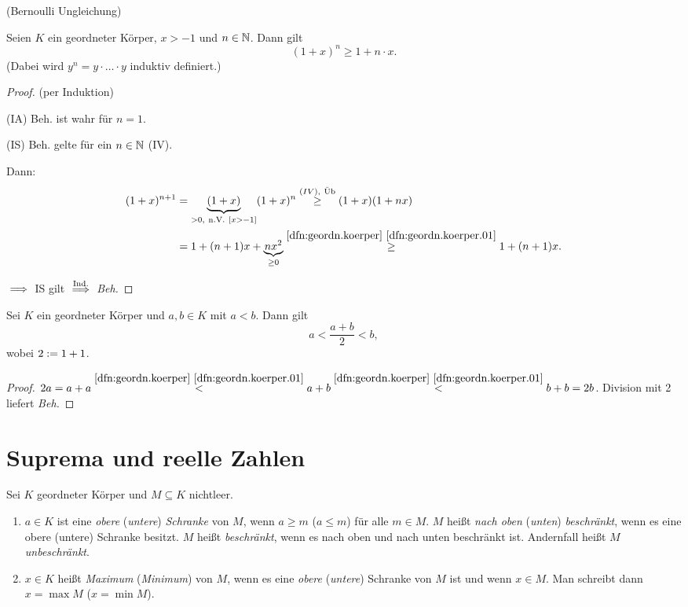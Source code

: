 \documentclass[12pt]{scrreprt}
\begin{document}
\begin{satz}\label{satz:bernoulli}(Bernoulli Ungleichung)

Seien $K$ ein geordneter Körper, $x > -1$ und $n\in\mathbb{N}$. Dann gilt
\[(1+x)^n \geq 1+n\cdot x.\]
(Dabei wird $y^n = y\cdot\ldots\cdot y$ induktiv definiert.)
\end{satz}

\begin{proof}\label{bew:bernoulli}(per Induktion)

(IA) Beh. ist wahr für $n=1$.

(IS) Beh. gelte für ein $n\in\mathbb{N}$ (IV).

Dann: 
\begin{align}(1+x)^{n+1} &= \underbrace{(1+x)}_{>0\mathrm{,\ n.V.\ }[x>-1]}(1+x)^n \stackrel{(IV),\ \mathrm{\ddot{U}b}}{\geq} (1+x)(1+nx)\nonumber\\
&= 1 + (n+1)x + \underbrace{nx^2}_{\geq 0} \stackrel{\ref{dfn:geordn.koerper}~\ref{dfn:geordn.koerper.01}}{\geq} 1+(n+1)x.\nonumber
\end{align}

$\implies$ IS gilt $\stackrel{\mathrm{Ind.}}{\implies}$ \textit{Beh.}
\end{proof}

\begin{lem}\label{lem:zahlen.mitte}
Sei $K$ ein geordneter Körper und $a,b\in K$ mit $a<b$. Dann gilt
\[a < \frac{a+b}{2} < b,\] wobei $2:= 1+1$.
\end{lem}

\begin{proof}
$2a = a+a \stackrel{\ref{dfn:geordn.koerper}~\ref{dfn:geordn.koerper.01}}{<} a+b \stackrel{\ref{dfn:geordn.koerper}~\ref{dfn:geordn.koerper.01}}{<} b+b = 2b$. Division mit 2 liefert \textit{Beh.}
\end{proof}

\section{Suprema und reelle Zahlen}\label{sec:zahlen.suprema}

\begin{dfn}\label{dfn:zahlen.schranken}
Sei $K$ geordneter Körper und $M \subseteq K$ nichtleer.
\begin{enumerate} %
\item $a\in K$ ist eine \textit{obere} (\textit{untere}) \textit{Schranke} von $M$, wenn $a \geq m$ ($a \leq m$) für alle $m\in M$. $M$ heißt \textit{nach oben} (\textit{unten}) \textit{beschränkt}, wenn es eine obere (untere) Schranke besitzt. $M$ heißt \textit{beschränkt}, wenn es nach oben und nach unten beschränkt ist. Andernfall heißt $M$ \textit{unbeschränkt}.

\item $x\in K$ heißt \textit{Maximum} (\textit{Minimum}) von $M$, wenn es eine \textit{obere} (\textit{untere}) Schranke von $M$ ist und wenn $x\in M$. Man schreibt dann $x = \max M$ ($x=\min M$).
\end{enumerate}
\end{dfn}
\end{document}
